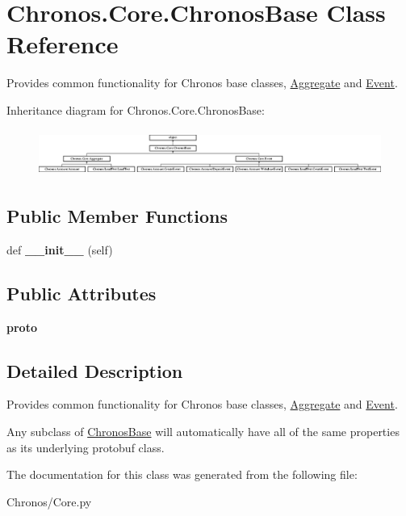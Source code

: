\hypertarget{classChronos_1_1Core_1_1ChronosBase}{}\section{Chronos.\+Core.\+Chronos\+Base Class Reference}
\label{classChronos_1_1Core_1_1ChronosBase}


Provides common functionality for Chronos base classes, \hyperlink{classChronos_1_1Core_1_1Aggregate}{Aggregate} and \hyperlink{classChronos_1_1Core_1_1Event}{Event}.  


Inheritance diagram for Chronos.\+Core.\+Chronos\+Base\+:\begin{figure}[H]
\begin{center}
\leavevmode
\includegraphics[height=1.545894cm]{classChronos_1_1Core_1_1ChronosBase}
\end{center}
\end{figure}
\subsection*{Public Member Functions}
\begin{DoxyCompactItemize}
\item 
def {\bfseries \+\_\+\+\_\+init\+\_\+\+\_\+} (self)
\end{DoxyCompactItemize}
\subsection*{Public Attributes}
\begin{DoxyCompactItemize}
\item 
{\bfseries proto}
\end{DoxyCompactItemize}


\subsection{Detailed Description}
Provides common functionality for Chronos base classes, \hyperlink{classChronos_1_1Core_1_1Aggregate}{Aggregate} and \hyperlink{classChronos_1_1Core_1_1Event}{Event}. 

Any subclass of \hyperlink{classChronos_1_1Core_1_1ChronosBase}{Chronos\+Base} will automatically have all of the same properties as its underlying protobuf class. 

The documentation for this class was generated from the following file\+:\begin{DoxyCompactItemize}
\item 
Chronos/Core.\+py\end{DoxyCompactItemize}
